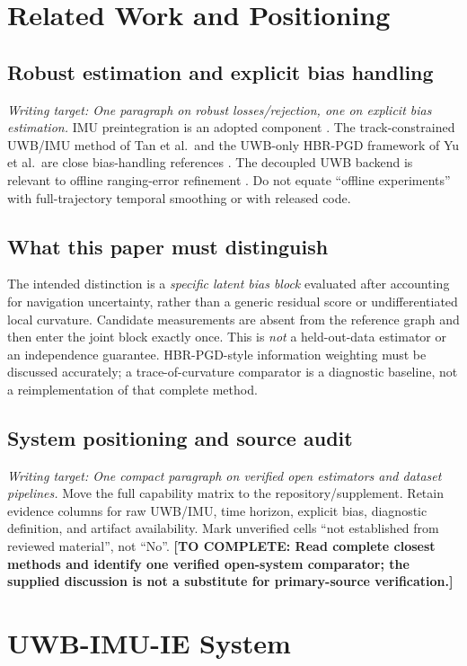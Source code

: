 \documentclass[conference]{IEEEtran}%
\newcommand{\todo}[1]{\textcolor{red!70!black}{\textbf{[TO COMPLETE: #1]}}}
\newcommand{\plan}[1]{\textit{Writing target: #1}}
\begin{document}
\section{Related Work and Positioning}
\label{sec:related}
\subsection{Robust estimation and explicit bias handling}
\plan{One paragraph on robust losses/rejection, one on explicit bias estimation.}
IMU preintegration is an adopted component \cite{forster2015}. The track-constrained UWB/IMU method of Tan et al.\ and the UWB-only HBR-PGD framework of Yu et al.\ are close bias-handling references \cite{tan2026,yu2026}. The decoupled UWB backend is relevant to offline ranging-error refinement \cite{lu2026}. Do not equate ``offline experiments'' with full-trajectory temporal smoothing or with released code.

\subsection{What this paper must distinguish}
The intended distinction is a \emph{specific latent bias block} evaluated after accounting for navigation uncertainty, rather than a generic residual score or undifferentiated local curvature. Candidate measurements are absent from the reference graph and then enter the joint block exactly once. This is \emph{not} a held-out-data estimator or an independence guarantee. HBR-PGD-style information weighting must be discussed accurately; a trace-of-curvature comparator is a diagnostic baseline, not a reimplementation of that complete method.

\subsection{System positioning and source audit}
\plan{One compact paragraph on verified open estimators and dataset pipelines.}
Move the full capability matrix to the repository/supplement. Retain evidence columns for raw UWB/IMU, time horizon, explicit bias, diagnostic definition, and artifact availability. Mark unverified cells ``not established from reviewed material'', not ``No''. \todo{Read complete closest methods and identify one verified open-system comparator; the supplied discussion is not a substitute for primary-source verification.}

\section{UWB-IMU-IE System}
\label{sec:system}
\end{document}

